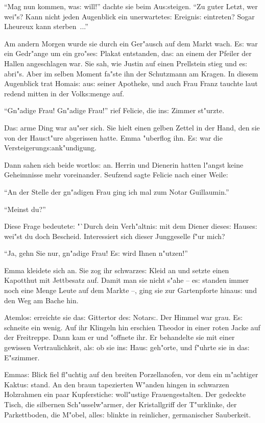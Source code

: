 \documentclass[oneside,12pt]{book}
\newcommand{\s}{s:}%
\begin{document}
"`Mag nun kommen, wa{\s} will!"' dachte sie beim Au{\s}steigen.
"`Zu guter Letzt, wer wei"s? Kann nicht jeden Augenblick ein
unerwartete{\s} Ereigni{\s} eintreten? Sogar Lheureux kann
sterben~..."'

Am andern Morgen wurde sie durch ein Ger"ausch auf dem Markt wach.
E{\s} war ein Gedr"ange um ein gro"se{\s} Plakat entstanden,
da{\s} an einem der Pfeiler der Hallen angeschlagen war. Sie sah,
wie Justin auf einen Prellstein stieg und e{\s} abri"s. Aber im
selben Moment fa"ste ihn der Schutzmann am Kragen. In diesem
Augenblick trat Homai{\s} au{\s} seiner Apotheke, und auch Frau
Franz tauchte laut redend mitten in der Volk{\s}menge auf.

"`Gn"adige Frau! Gn"adige Frau!"' rief Felicie, die in{\s} Zimmer
st"urzte.

Da{\s} arme Ding war au"ser sich. Sie hielt einen gelben Zettel in
der Hand, den sie von der Hau{\s}t"ure abgerissen hatte. Emma
"uberflog ihn. E{\s} war die Versteigerung{\s}ank"undigung.

Dann sahen sich beide wortlo{\s} an. Herrin und Dienerin hatten
l"angst keine Geheimnisse mehr voreinander. Seufzend sagte Felicie
nach einer Weile:

"`An der Stelle der gn"adigen Frau ging ich mal zum Notar
Guillaumin."'

"`Meinst du?"'

Diese Frage bedeutete: "`Durch dein Verh"altni{\s} mit dem Diener
diese{\s} Hause{\s} wei"st du doch Bescheid. Interessiert sich
dieser Junggeselle f"ur mich?

"`Ja, gehn Sie nur, gn"adige Frau! E{\s} wird Ihnen n"utzen!"'

Emma kleidete sich an. Sie zog ihr schwarze{\s} Kleid an und
setzte einen Kapotthut mit Jettbesatz auf. Damit man sie nicht
s"ahe -- e{\s} standen immer noch eine Menge Leute auf dem Markte
--, ging sie zur Gartenpforte hinau{\s} und den Weg am Bache hin.

Atemlo{\s} erreichte sie da{\s} Gittertor de{\s} Notar{\s}. Der
Himmel war grau. E{\s} schneite ein wenig. Auf ihr Klingeln hin
erschien Theodor in einer roten Jacke auf der Freitreppe. Dann kam
er und "offnete ihr. Er behandelte sie mit einer gewissen
Vertraulichkeit, al{\s} ob sie in{\s} Hau{\s} geh"orte, und
f"uhrte sie in da{\s} E"szimmer.

Emma{\s} Blick fiel fl"uchtig auf den breiten Porzellanofen, vor
dem ein m"achtiger Kaktu{\s} stand. An den braun tapezierten
W"anden hingen in schwarzen Holzrahmen ein paar Kupferstiche:
woll"ustige Frauengestalten. Der gedeckte Tisch, die silbernen
Sch"usselw"armer, der Kristallgriff der T"urklinke, der
Parkettboden, die M"obel, alle{\s} blinkte in reinlicher,
germanischer Sauberkeit.
\end{document}
